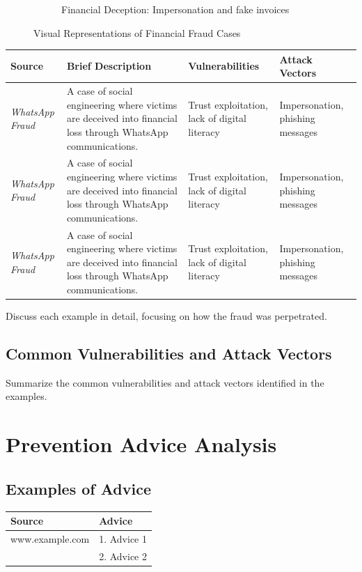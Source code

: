 \documentclass[11pt]{article}
\begin{document}
\begin{figure}[ht]
\begin{subfigure}{.3\textwidth}
      \caption{Financial Deception: Impersonation and fake invoices}
      \label{fig:sub3}
    \end{subfigure}
    \caption{Visual Representations of Financial Fraud Cases}
    \label{fig:test}
    \end{figure}

\begin{tabular}{@{}llll@{}}
\toprule
\textbf{Source} & \textbf{Brief Description} & \textbf{Vulnerabilities} & \textbf{Attack Vectors} \\ \midrule
\textit{WhatsApp Fraud} & A case of social engineering where victims are deceived into financial loss through WhatsApp communications. & Trust exploitation, lack of digital literacy & Impersonation, phishing messages \\
\textit{WhatsApp Fraud} & A case of social engineering where victims are deceived into financial loss through WhatsApp communications. & Trust exploitation, lack of digital literacy & Impersonation, phishing messages \\
\textit{WhatsApp Fraud} & A case of social engineering where victims are deceived into financial loss through WhatsApp communications. & Trust exploitation, lack of digital literacy & Impersonation, phishing messages \\
\bottomrule
\end{tabular}

Discuss each example in detail, focusing on how the fraud was perpetrated.

\subsection{Common Vulnerabilities and Attack Vectors}
Summarize the common vulnerabilities and attack vectors identified in the examples.

\section{Prevention Advice Analysis}
\subsection{Examples of Advice}
\begin{tabular}{@{}ll@{}}
\toprule
\textbf{Source} & \textbf{Advice} \\ \midrule
www.example.com & 1. Advice 1 \\ 
                & 2. Advice 2 \\
\bottomrule
\end{tabular}
\end{document}
